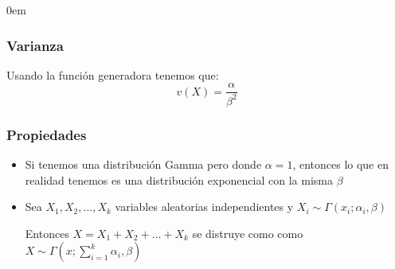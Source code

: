 \documentclass[12pt, fleqn]{report}                             %
\newenvironment{SmallIndentation}[1][0.75em]                    %
        {\begin{adjustwidth}{#1}{}\begin{footnotesize}}             %
        {\end{footnotesize}\end{adjustwidth}}                       %
\theoremstyle{break}                                            %
\begin{document}
\begin{multicols}{2}
\begin{SmallIndentation}[0em]
                    \subsubsection{Varianza}

                        Usando la función generadora tenemos que:
                        \begin{equation*}
                            v(X) = \dfrac{\alpha}{\beta^2}
                        \end{equation*}


                    \subsubsection{Propiedades}

                        \begin{itemize}

                            \item
                                Si tenemos una distribución Gamma pero donde $\alpha = 1$, entonces lo que
                                en realidad tenemos es una distribución exponencial con la misma $\beta$

                            \item 
                                Sea $X_1, X_2, \dots, X_k$ variables aleatorias independientes
                                y $X_i \sim \Gamma(x_i; \alpha_i, \beta)$ 

                                Entonces $X = X_1 + X_2 + \dots + X_k$ se distruye como
                                como $X \sim \Gamma(x; \sum_{i=1}^k \alpha_i, \beta)$

                        \end{itemize}
                    

                \end{SmallIndentation}
                \end{multicols}
\end{document}
